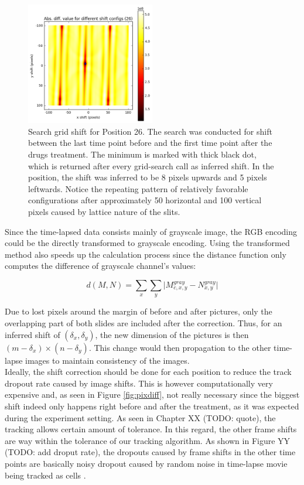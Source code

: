 \documentclass[pdftex,12pt,a4paper]{report}
\begin{document}
\begin{figure}[h]
\centering
\includegraphics[width=0.5\textwidth]{images/search_grid}
\caption{Search grid shift for Position 26. The search was conducted for shift between the last time point before and the first time point after the drugs treatment. The minimum is marked with thick black dot, which is returned after every grid-search call as inferred shift. In the position, the shift was inferred to be 8 pixels upwards and 5 pixels leftwards. Notice the repeating pattern of relatively favorable configurations after approximately 50 horizontal and 100 vertical pixels caused by lattice nature of the slits.}
\label{fig:searchgrid}
\end{figure}


Since the time-lapsed data consists mainly of grayscale image, the RGB encoding could be the directly transformed to grayscale encoding. Using the transformed method also speeds up the calculation process since the distance function only computes the difference of grayscale channel's values:

$$
d(M, N) =  \sum_{x} \sum_{y} \vert M_{c, x, y}^{gray} - N_{x, y}^{gray}\vert
$$

Due to lost pixels around the margin of before and after pictures, only the overlapping part of both slides are included after the correction. Thus, for an inferred shift of $(\delta_x, \delta_y)$, the new dimension of the pictures is then $(m - \delta_x) \times (n - \delta_y)$. This change would then propagation to the other time-lapse images to maintain consistency of the images.\\

Ideally, the shift correction should be done for each position to reduce the track dropout rate caused by image shifts. This is however computationally very expensive and, as seen in Figure \ref{fig:pixdiff}, not really necessary since the biggest shift indeed only happens right before and after the treatment, as it was expected during the experiment setting. As seen in Chapter XX (TODO: quote), the tracking allows certain amount of tolerance. In this regard, the other frame shifts are way within the tolerance of our tracking algorithm. As shown in Figure YY (TODO: add droput rate), the dropouts caused by frame shifts in the other time points are basically noisy dropout caused by random noise in time-lapse movie being tracked as cells \cite{jaqaman2008robust}.
\end{document}
